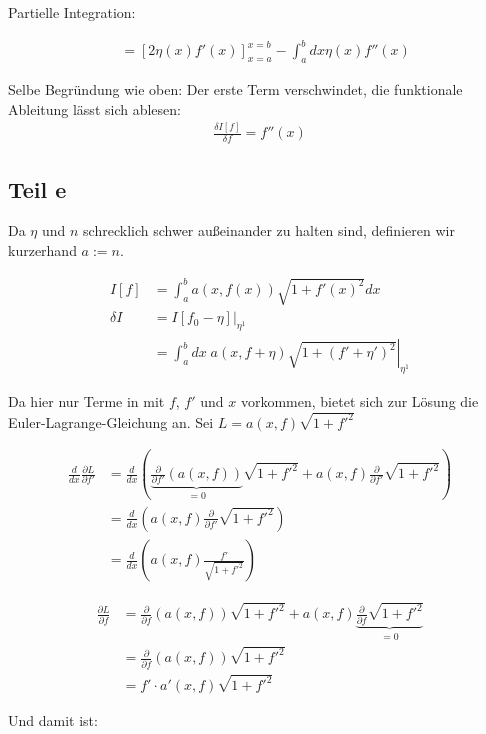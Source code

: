 \documentclass[a4paper,german,12pt,smallheadings]{scrartcl}
\begin{document}
Partielle Integration:

\begin{align*}
  &=\left[2\eta(x) f'(x)\right]_{x=a}^{x=b} - \int_a^b dx \eta(x) f''(x)
\end{align*}

Selbe Begründung wie oben: Der erste Term verschwindet, die funktionale Ableitung lässt sich ablesen:
\begin{align*}
  \frac{\delta I[f]}{\delta f} = f''(x)
\end{align*}

\subsection*{Teil e}
Da $\eta$ und $n$ schrecklich schwer außeinander zu halten sind,
definieren wir kurzerhand $a := n$.

\begin{align*}
  I[f] &= \int_a^b a(x,f(x)) \sqrt{1+f'(x)^2} dx \\
  \delta I &= \left.I[f_0 - \eta]\right|_{\eta^1} \\
  &=\left.\int_a^b dx \; a(x, f + \eta) \sqrt{1+(f'+\eta')^2} \right|_{\eta^1}
\end{align*}

Da hier nur Terme in mit $f$, $f'$ und $x$ vorkommen, bietet sich zur Lösung
die Euler-Lagrange-Gleichung an. Sei $L = a(x, f) \sqrt{1+f'^2}$

\begin{align*}
  \frac{d}{dx} \frac{\partial L}{\partial f'} &= \frac{d}{dx} \left(\underbrace{\frac{\partial}{\partial f'} (a(x, f))}_{=0} \sqrt{1+f'^2} + a(x,f) \frac{\partial}{\partial f'} \sqrt{1+f'^2} \right) \\
  &= \frac{d}{dx} \left(a(x,f) \frac{\partial}{\partial f'} \sqrt{1+f'^2} \right) \\
  &= \frac{d}{dx} \left(a(x,f) \frac{f'}{\sqrt{1+f'^2}} \right)
\end{align*}

\begin{align*}
  \frac{\partial L}{\partial f} &= \frac{\partial}{\partial f} \left(a(x, f)\right) \sqrt{1+f'^2} + a(x, f) \underbrace{\frac{\partial}{\partial f} \sqrt{1+f'^2}}_{=0} \\
  &= \frac{\partial}{\partial f} \left(a(x, f)\right) \sqrt{1+f'^2} \\
  &= f' \cdot a'(x, f) \sqrt{1+f'^2}
\end{align*}

Und damit ist:
\end{document}
